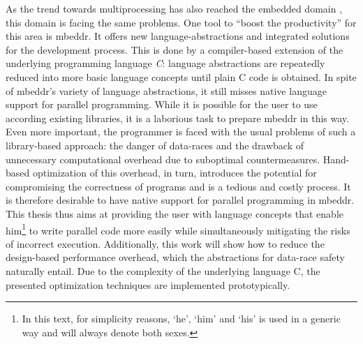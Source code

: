 As the trend towards multiprocessing has also reached the embedded domain \cite{MulticoreChallenges}\cite{LeveragingTheBenefits}, this domain is facing the same problems. One tool to ``boost the productivity''\cite{mbeddr} for this area is mbeddr. It offers new language-abstractions and integrated solutions for the development process. This is done by a compiler-based extension of the underlying programming language \textit{C}: language abstractions are repeatedly reduced into more basic language concepts until plain C code is obtained. In spite of mbeddr's variety of language abstractions, it still misses native language support for parallel programming. While it is possible for the user to use according existing libraries, it is a laborious task to prepare mbeddr in this way. Even more important, the programmer is faced with the usual problems of such a library-based approach: the danger of data-races and the drawback of unnecessary computational overhead due to suboptimal countermeasures. Hand-based optimization of this overhead, in turn, introduces the potential for compromising the correctness of programs and is a tedious and costly process. It is therefore desirable to have native support for parallel programming in mbeddr. This thesis thus aims at providing the user with language concepts that enable him\footnote{In this text, for simplicity reasons, `he', `him' and `his' is used in a generic way and will always denote both sexes.} to write parallel code more easily while simultaneously mitigating the risks of incorrect execution. Additionally, this work will show how to reduce the design-based performance overhead, which the abstractions for data-race safety naturally entail. Due to the complexity of the underlying language C, the presented optimization techniques are implemented prototypically. 

